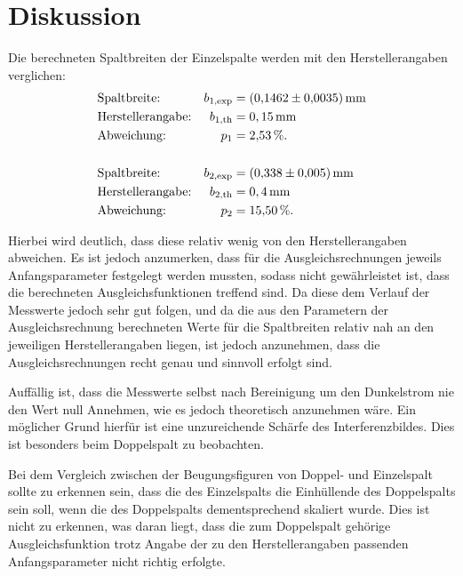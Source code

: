 \section{Diskussion}
\label{sec:Diskussion}

Die berechneten Spaltbreiten der Einzelspalte werden mit den Herstellerangaben verglichen:
\begin{align*}
  &\text{Spaltbreite:} & b_\text{1,exp} &= (\num{0.1462 +- 0.0035})\,\si{\milli\meter} \\
  &\text{Herstellerangabe:} & b_\text{1,th} &= 0,15\,\si{\milli\meter} \\
  &\text{Abweichung:} & p_1 &= \num{2,53}\,\%.\\ \\
  &\text{Spaltbreite:} & b_\text{2,exp} &= (\num{0.338 +- 0.005}) \,\si{\milli\meter} \\
  &\text{Herstellerangabe:} & b_\text{2,th} &= 0,4\,\si{\milli\meter} \\
  &\text{Abweichung:} & p_2 &= \num{15,50}\,\%.
\end{align*}

Hierbei wird deutlich, dass diese relativ wenig von den Herstellerangaben abweichen.
Es ist jedoch anzumerken, dass für die Ausgleichsrechnungen jeweils Anfangsparameter festgelegt
werden mussten, sodass nicht gewährleistet ist, dass die berechneten Ausgleichsfunktionen
treffend sind. Da diese dem Verlauf der Messwerte jedoch sehr gut folgen, und da
die aus den Parametern der Ausgleichsrechnung berechneten Werte für die Spaltbreiten
relativ nah an den jeweiligen Herstellerangaben liegen, ist jedoch
anzunehmen, dass die Ausgleichsrechnungen recht genau und sinnvoll erfolgt sind.

Auffällig ist, dass die Messwerte selbst nach Bereinigung um den Dunkelstrom nie
den Wert null Annehmen, wie es jedoch theoretisch anzunehmen wäre. Ein möglicher Grund
hierfür ist eine unzureichende Schärfe des Interferenzbildes. Dies ist besonders beim
Doppelspalt zu beobachten.

Bei dem Vergleich zwischen der Beugungsfiguren von Doppel- und Einzelspalt sollte zu
erkennen sein, dass die des Einzelspalts die Einhüllende des Doppelspalts sein soll, wenn die
des Doppelspalts dementsprechend skaliert wurde. Dies ist nicht zu erkennen, was  
daran liegt, dass die zum Doppelspalt gehörige Ausgleichsfunktion 
trotz Angabe der zu den Herstellerangaben passenden
Anfangsparameter nicht richtig erfolgte.

